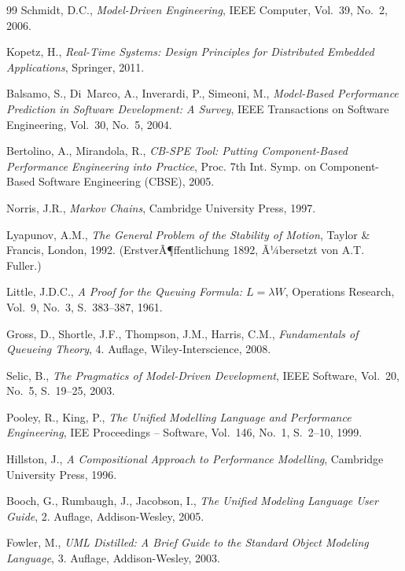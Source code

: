 ﻿\documentclass[a4paper,12pt]{report}
\theoremstyle{definition}
\begin{document}
\begin{thebibliography}{99}
	Schmidt, D.C.,
	\textit{Model-Driven Engineering},
	IEEE Computer, Vol.~39, No.~2, 2006.

	Kopetz, H.,
	\textit{Real-Time Systems: Design Principles for Distributed
		Embedded Applications},
	Springer, 2011.

	Balsamo, S., Di~Marco, A., Inverardi, P., Simeoni, M.,
	\textit{Model-Based Performance Prediction in Software Development:
		A Survey},
	IEEE Transactions on Software Engineering, Vol.~30, No.~5, 2004.

	Bertolino, A., Mirandola, R.,
	\textit{CB-SPE Tool: Putting Component-Based Performance Engineering
		into Practice},
	Proc. 7th Int. Symp. on Component-Based Software Engineering
	(CBSE), 2005.

	Norris, J.R.,
	\textit{Markov Chains},
	Cambridge University Press, 1997.

	Lyapunov, A.M.,
	\textit{The General Problem of the Stability of Motion},
	Taylor \& Francis, London, 1992.
	(ErstverÃ¶ffentlichung 1892, Ã¼bersetzt von A.T. Fuller.)

	Little, J.D.C.,
	\textit{A Proof for the Queuing Formula: $L = \lambda W$},
	Operations Research, Vol.~9, No.~3, S.~383--387, 1961.

	Gross, D., Shortle, J.F., Thompson, J.M., Harris, C.M.,
	\textit{Fundamentals of Queueing Theory},
	4. Auflage, Wiley-Interscience, 2008.

	Selic, B.,
	\textit{The Pragmatics of Model-Driven Development},
	IEEE Software, Vol.~20, No.~5, S.~19--25, 2003.

	Pooley, R., King, P.,
	\textit{The Unified Modelling Language and Performance Engineering},
	IEE Proceedings -- Software, Vol.~146, No.~1, S.~2--10, 1999.

	Hillston, J.,
	\textit{A Compositional Approach to Performance Modelling},
	Cambridge University Press, 1996.

	Booch, G., Rumbaugh, J., Jacobson, I.,
	\textit{The Unified Modeling Language User Guide},
	2. Auflage, Addison-Wesley, 2005.

	Fowler, M.,
	\textit{UML Distilled: A Brief Guide to the Standard Object
		Modeling Language},
	3. Auflage, Addison-Wesley, 2003.


\end{thebibliography}
\end{document}
